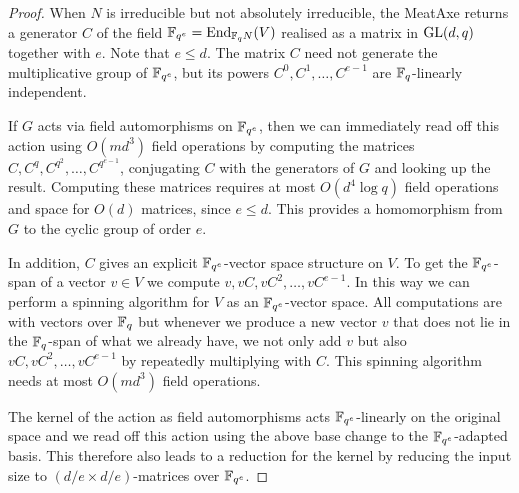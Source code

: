 \begin{proof}
When  $N$ is irreducible but not absolutely irreducible,
the MeatAxe returns a generator $C$ of
the field $\F_{q^e} = \End_{\F_q N}(V)$ realised as a matrix in
$\GL(d,q)$ together with  $e$. Note that $e \le d$. 
The matrix $C$ need not generate the
multiplicative group of $\mathbb{F}_{q^e}$, but its powers $C^0, C^1, \ldots,
C^{e-1}$ are $\mathbb{F}_q$-linearly independent. 

If $G$ acts via field automorphisms on $\mathbb{F}_{q^e}$, then we can immediately
read off this action using $O(md^3)$ field operations by computing
the matrices $C, C^q, C^{q^2}, \ldots, C^{q^{e-1}}$, conjugating
$C$ with the generators of $G$ and looking up the result. 
Computing these matrices requires at most $O(d^4 \log q)$ field
operations and space for $O(d)$ matrices, since $e \le d$.
This provides a homomorphism from $G$ to the cyclic group of order
$e$.

In addition,  $C$ gives an
explicit $\mathbb{F}_{q^e}$-vector space structure on  $V$.
To get the $\mathbb{F}_{q^e}$-span of a vector $v \in V$ we  compute
$v, vC, vC^2, \ldots, vC^{e-1}$. In this way we can 
perform a spinning algorithm for $V$ as an $\mathbb{F}_{q^e}$-vector space. All
computations are with vectors over $\mathbb{F}_q$ but whenever
we produce a new vector $v$ that does not lie in the $\mathbb{F}_q$-span of what we
already have, we not only add $v$ but also $vC, vC^2, \ldots,
vC^{e-1}$ by repeatedly multiplying with $C$. 
This spinning algorithm needs at most $O(md^3)$ field
operations.

The kernel of the action as field automorphisms acts $\mathbb{F}_{q^e}$-linearly
on the original space and we read off this action using
the above base change to the $\mathbb{F}_{q^e}$-adapted basis. This therefore also
 leads to a reduction for the kernel by reducing the input size to
$(d/e \times d/e)$-matrices over $\mathbb{F}_{q^e}$. 


\end{proof}
